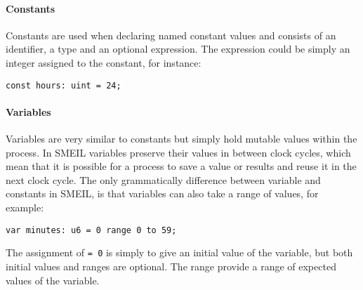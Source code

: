 \paragraph{Constants}
Constants are used when declaring named constant values and consists of an identifier, a type and an optional expression. The expression could be simply an integer assigned to the constant, for instance:
\begin{verbatim}
const hours: uint = 24;
\end{verbatim}

\paragraph{Variables}
Variables are very similar to constants but simply hold mutable values within the process. In SMEIL variables preserve their values in between clock cycles, which mean that it is possible for a process to save a value or results and reuse it in the next clock cycle.
The only grammatically difference between variable and constants in SMEIL, is that variables can also take a range of values, for example:
\begin{verbatim}
var minutes: u6 = 0 range 0 to 59;
\end{verbatim}
The assignment of \texttt{= 0} is simply to give an initial value of the variable, but both initial values and ranges are optional. The range provide a range of expected values of the variable.

